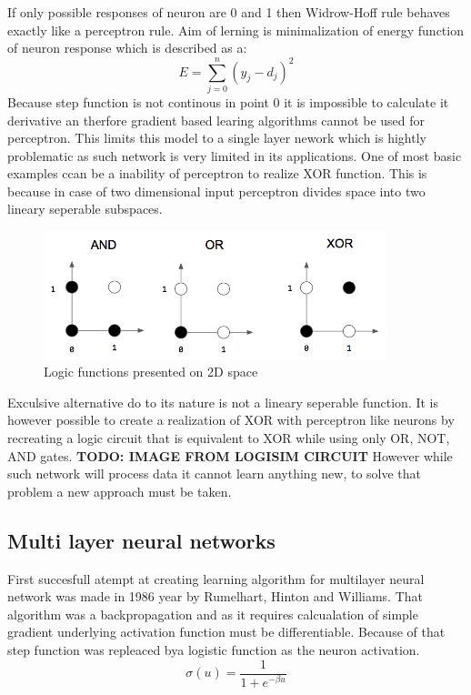 If only possible responses of neuron are 0 and 1 then Widrow-Hoff rule behaves exactly like a
perceptron rule.
Aim of lerning is minimalization of energy function of neuron response which is described as a:
\begin{equation}
	E = \sum_{j=0}^{n}(y_{j}-d_{j})^{2}
\end{equation}
Because step function is not continous in point 0 it is impossible to calculate it derivative
an therfore gradient based learing algorithms cannot be used for perceptron.
This limits this model to a single layer nework which is hightly problematic as such network
is very limited in its applications.
One of most basic examples ccan be a inability of perceptron to realize XOR function.
This is because in case of two dimensional input perceptron divides space into two lineary
seperable subspaces.
\begin{figure}[h] 
	\centering
	\includegraphics[width=10cm]{res/logic_neuron}
	\caption{Logic functions presented on 2D space}
	\label{fig:logic_neuron}
\end{figure}
Exculsive alternative do to its nature is not a lineary seperable function. It is however
possible to create a realization of XOR with perceptron like neurons by recreating a logic
circuit that is equivalent to XOR while using only OR, NOT, AND gates.
\textbf{TODO: IMAGE FROM LOGISIM CIRCUIT}
However while such network will process data it cannot learn anything new, to solve that 
problem a new approach must be taken.

\subsection{Multi layer neural networks}
First succesfull atempt at creating learning algorithm for multilayer neural network was made
in 1986 year by Rumelhart, Hinton and Williams. That algorithm was a backpropagation and as it
requires calcualation of simple gradient underlying activation function must be differentiable.
Because of that step function was repleaced bya logistic function as the neuron activation.
\begin{equation}
	\sigma(u) = \frac{1}{1+e^{-\beta u}}
\end{equation}

